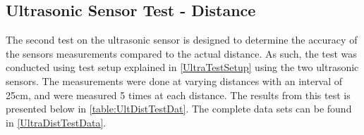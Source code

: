 \subsection{Ultrasonic Sensor Test - Distance}
The second test on the ultrasonic sensor is designed to determine the accuracy
of the sensors measurements compared to the actual distance. As such, the test
was conducted using test setup explained in \autoref{UltraTestSetup} using the
two ultrasonic sensors. The measurements were done at varying distances with an
interval of 25cm, and were measured 5 times at each distance. The results from
this test is presented below in \autoref{table:UltDistTestDat}. The complete
data sets can be found in \autoref{UltraDistTestData}.



% 




